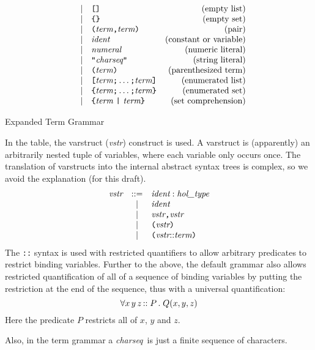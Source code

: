 \documentclass[12pt,fleqn,a4paper]{report}
\newcommand{\ident}      {\mbox{\it ident}}
\newcommand{\numeral}    {\mbox{\it numeral}}
\newcommand{\charseq}    {\mbox{\it charseq}}
\newcommand{\vstr}       {\mbox{\it vstr}}
\newcommand{\type}       {\mbox{\it hol\_type}}
\newcommand{\term}       {\mbox{\it term}}
\begin{document}
\begin{table}
\[\begin{array}{rclr}
    & | & \verb+[]+ & \mbox{(empty list)} \\
    & | & \verb+{}+ & \mbox{(empty set)} \\
    & | & \verb+(+ \term \verb+,+ \term \verb+)+ & \mbox{(pair)} \\
    & | & \ident & \mbox{(constant or variable)} \\
    & | & \numeral & \mbox{(numeric literal)} \\
    & | & \verb+"+\charseq \verb+"+& \mbox{(string literal)} \\
    & | & \verb+(+ \term \verb+)+ & \mbox{(parenthesized term)} \\
    & | & \verb+[+ \term \verb+;+ \ldots \verb+;+ \term \verb+]+ &
    \mbox{(enumerated list)} \\
    & | & \verb+{+ \term \verb+;+ \ldots \verb+;+ \term \verb+}+ &
    \mbox{(enumerated set)} \\
    & | & \verb+{+ \term \ \verb+|+\  \term \verb+}+ & \mbox{(set comprehension)}
  \end{array}
  \]
  \caption{Expanded Term Grammar} \label{expanded-grammar}
\end{table}

In the table, the varstruct ({\it vstr\/}) construct is used. A
varstruct is (apparently) an arbitrarily nested tuple of variables,
where each variable only occurs once. The translation of varstructs
into the internal abstract syntax trees is complex, so we avoid the
explanation (for this draft).
\[
\begin{array}{rcl}
  \vstr & ::= & \ident : \type \\
  & | & \ident  \\
  & | & \vstr \verb+,+ \vstr \\
  & | & \verb+(+ \vstr \verb+)+\\
  & | & \verb+(+\vstr {\tt ::} \term\verb+)+\\
\end{array}
\] The {\tt ::} syntax is used with restricted quantifiers to allow
arbitrary predicates to restrict binding variables.  Further to the
above, the default grammar also allows restricted quantification of
all of a sequence of binding variables by putting the restriction at
the end of the sequence, thus with a universal quantification: \[
\forall x \, y \, z \, {\tt ::} \; P \, . \; Q(x,y,z)
\] Here the predicate $P$ restricts all of $x$, $y$ and $z$.

Also, in the term grammar a \charseq\ is just a finite sequence of
characters.
\end{document}
